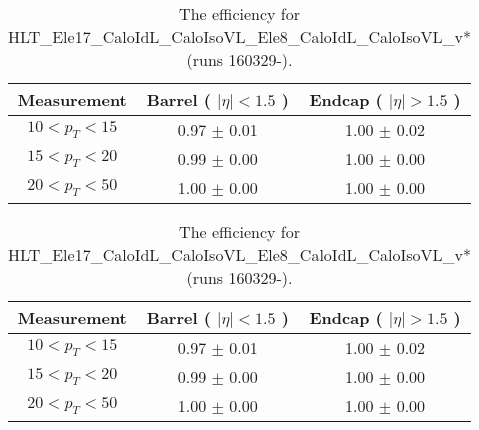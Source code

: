 \begin{table}[!ht]
\begin{center}
\begin{tabular}{c|c|c}
\hline
Measurement & Barrel ( $|\eta|<1.5$ )   & Endcap ( $|\eta|>1.5$ )  \\ 
\hline
$  10<p_T<  15$ & 0.97 $\pm$ 0.01  & 1.00 $\pm$ 0.02  \\ \hline 
$  15<p_T<  20$ & 0.99 $\pm$ 0.00  & 1.00 $\pm$ 0.00  \\ \hline 
$  20<p_T<  50$ & 1.00 $\pm$ 0.00  & 1.00 $\pm$ 0.00  \\ \hline 
\end{tabular}
\caption{The efficiency for HLT\_Ele17\_CaloIdL\_CaloIsoVL\_Ele8\_CaloIdL\_CaloIsoVL\_v* (runs 160329-).}
\label{tab:eff_ele_17_8_A}
\end{center}
\end{table}

\begin{table}[!ht]
\begin{center}
\begin{tabular}{c|c|c}
\hline
Measurement & Barrel ( $|\eta|<1.5$ )   & Endcap ( $|\eta|>1.5$ )  \\ 
\hline
$  10<p_T<  15$ & 0.97 $\pm$ 0.01  & 1.00 $\pm$ 0.02  \\ \hline 
$  15<p_T<  20$ & 0.99 $\pm$ 0.00  & 1.00 $\pm$ 0.00  \\ \hline 
$  20<p_T<  50$ & 1.00 $\pm$ 0.00  & 1.00 $\pm$ 0.00  \\ \hline 
\end{tabular}
\caption{The efficiency for HLT\_Ele17\_CaloIdL\_CaloIsoVL\_Ele8\_CaloIdL\_CaloIsoVL\_v* (runs 160329-).}
\label{tab:eff_ele_17_8_B}
\end{center}
\end{table}

